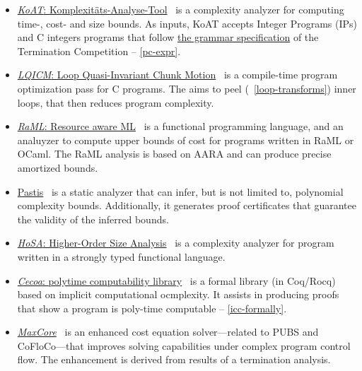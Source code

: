 \begin{itemize}
\item  \href{https://koat.verify.rwth-aachen.de/cfr_mprf}{\emph{KoAT}:
       \underline{Ko}mplexitäts-\underline{A}nalyse-\underline{T}ool}~\cite{brockschmidt2016}
       is a complexity analyzer for computing time-, cost- and size bounds.
       As inputs, KoAT accepts Integer Programs (IPs) and C integers programs that follow
       \href{https://termination-portal.org/wiki/C_Integer_Programs}{the grammar specification} of the Termination Competition -- \autoref{pc-expr}.

\item  \href{https://github.com/statycc/LQICM_On_C_Toy_Parser}{\emph{LQICM}: Loop Quasi-Invariant Chunk Motion}~\cite{moyen20172}
       is a compile-time program optimization pass for C programs.
       The aims to peel (\cf~\autoref{loop-transforms}) inner loops, that then reduces program complexity.

\item   \href{https://www.raml.co/about/}{\emph{RaML}: Resource aware ML}~\cite{hoffmann2017}
       is a functional programming language, and an analuyzer to compute upper bounds of cost for programs
       written in RaML or OCaml.
       The RaML analysis is based on AARA and can produce precise amortized bounds.

\item \href{https://www.cs.yale.edu/homes/qcar/diss/}{Pastis}~\cite{carbonneaux2017}
      is a static analyzer that can infer, but is not limited to, polynomial complexity bounds.
      Additionally, it generates proof certificates that guarantee the validity of the inferred bounds.

\item \href{http://cl-informatik.uibk.ac.at/users/zini/software/hosa/}{\emph{HoSA}:
      Higher-Order Size Analysis}~\cite{avanzini2017}
      is a complexity analyzer for program written in a strongly typed functional language.

\item \href{https://github.com/davidnowak/cecoa}{\emph{Cecoa}: polytime computability library}~\cite{feree2018}
       is a formal library (in Coq/Rocq) based on implicit computational ocmplexity.
       It assists in producing proofs that show a program is poly-time computable -- \autoref{icc-formally}.

\item \href{https://costa.fdi.ucm.es/maxcore/}{\emph{MaxCore}}~\cite{albert2019}
       is an enhanced cost equation solver---related to PUBS and CoFloCo---that improves solving capabilities under complex program control flow.
       The enhancement is derived from results of a termination analysis.


\end{itemize}
